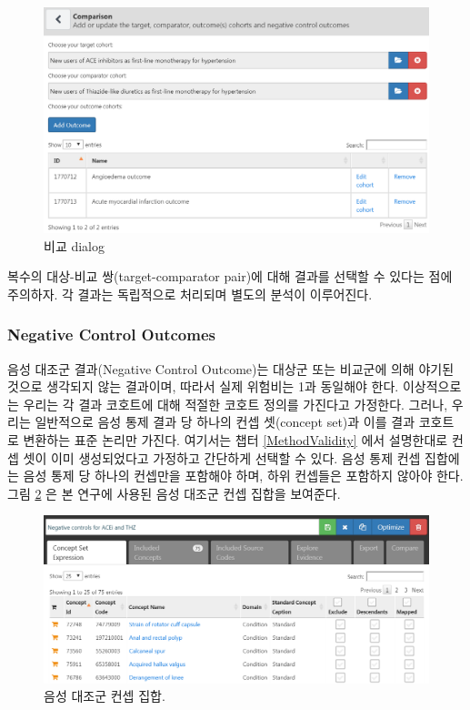 \documentclass[11pt]{book}
\theoremstyle{definition}
\theoremstyle{definition}
\theoremstyle{definition}
\theoremstyle{remark}
\begin{document}
\begin{figure}

{\centering \includegraphics[width=1\linewidth]{images/PopulationLevelEstimation/comparisons} 

}

\caption{비교 dialog}\label{fig:comparisons}
\end{figure}

복수의 대상-비교 쌍(target-comparator pair)에 대해 결과를 선택할 수
있다는 점에 주의하자. 각 결과는 독립적으로 처리되며 별도의 분석이
이루어진다.

\subsubsection*{Negative Control
Outcomes}\label{negative-control-outcomes}

음성 대조군 결과(Negative Control Outcome)는 대상군 또는 비교군에 의해
야기된 것으로 생각되지 않는 결과이며, 따라서 실제 위험비는 1과 동일해야
한다. 이상적으로는 우리는 각 결과 코호트에 대해 적절한 코호트 정의를
가진다고 가정한다. 그러나, 우리는 일반적으로 음성 통제 결과 당 하나의
컨셉 셋(concept set)과 이를 결과 코호트로 변환하는 표준 논리만 가진다.
여기서는 챕터 \ref{MethodValidity} 에서 설명한대로 컨셉 셋이 이미
생성되었다고 가정하고 간단하게 선택할 수 있다. 음성 통제 컨셉 집합에는
음성 통제 당 하나의 컨셉만을 포함해야 하며, 하위 컨셉들은 포함하지
않아야 한다. 그림 \ref{fig:ncConceptSet} 은 본 연구에 사용된 음성 대조군
컨셉 집합을 보여준다.

\begin{figure}

{\centering \includegraphics[width=1\linewidth]{images/PopulationLevelEstimation/ncConceptSet} 

}

\caption{음성 대조군 컨셉 집합.}\label{fig:ncConceptSet}
\end{figure}
\end{document}
